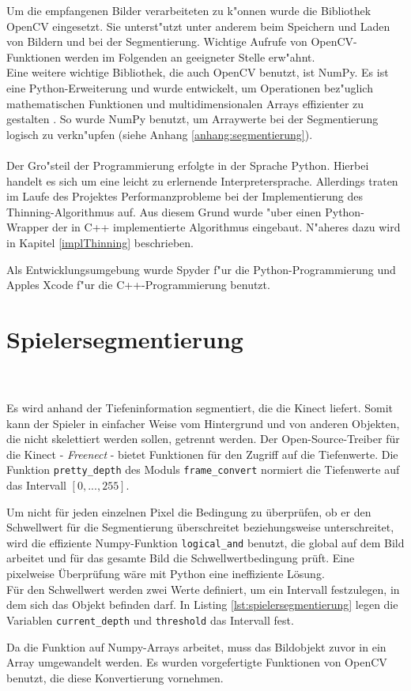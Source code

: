 Um die empfangenen Bilder verarbeiteten zu k"onnen wurde die Bibliothek OpenCV eingesetzt. Sie unterst"utzt unter anderem beim Speichern und Laden von Bildern und bei der Segmentierung. Wichtige Aufrufe von OpenCV-Funktionen werden im Folgenden an geeigneter Stelle erw"ahnt.\\
Eine weitere wichtige Bibliothek, die auch OpenCV benutzt, ist NumPy. Es ist eine Python-Erweiterung und wurde entwickelt, um Operationen bez"uglich mathematischen Funktionen und multidimensionalen Arrays effizienter zu gestalten \cite{numpy}. So wurde NumPy benutzt, um Arraywerte bei der Segmentierung logisch zu verkn"upfen (siehe Anhang \ref{anhang:segmentierung}). \\ \\ 
Der Gro"steil der Programmierung erfolgte in der Sprache Python. Hierbei handelt es sich um eine leicht zu erlernende Interpretersprache. Allerdings traten im Laufe des Projektes Performanzprobleme bei der Implementierung des Thinning-Algorithmus auf. 
 Aus diesem Grund wurde "uber einen Python-Wrapper der in C++ implementierte Algorithmus eingebaut. N"aheres dazu wird in Kapitel \ref{implThinning} beschrieben.

Als Entwicklungsumgebung wurde Spyder f"ur die Python-Programmierung und Apples Xcode f"ur die C++-Programmierung benutzt.

\section{Spielersegmentierung}
\label{segmentierung}
\\\\
Es wird anhand der Tiefeninformation segmentiert, die die Kinect liefert. Somit kann der Spieler in einfacher Weise vom Hintergrund und von anderen Objekten, die nicht skelettiert werden sollen, getrennt werden. Der Open-Source-Treiber für die Kinect - \emph{Freenect} - bietet Funktionen für den Zugriff auf die
Tiefenwerte. Die Funktion \texttt{pretty\_depth} des Moduls
\texttt{frame\_convert} normiert die Tiefenwerte auf das 
Intervall $[0,...,255]$. 

Um nicht für jeden einzelnen Pixel die Bedingung zu überprüfen, ob er den Schwellwert für die Segmentierung überschreitet beziehungsweise unterschreitet, wird die effiziente Numpy-Funktion \texttt{logical\_and} benutzt, die global auf dem Bild arbeitet und für das gesamte Bild die Schwellwertbedingung prüft. Eine pixelweise Überprüfung wäre mit Python eine ineffiziente Lösung.\\ Für den Schwellwert werden zwei 
Werte definiert, um ein Intervall festzulegen, in dem sich das Objekt befinden darf. In Listing \ref{lst:spielersegmentierung} legen die Variablen \texttt{current\_depth} und \texttt{threshold} das Intervall fest. 

Da die Funktion auf Numpy-Arrays arbeitet, muss das Bildobjekt zuvor in ein Array umgewandelt werden. 
Es wurden vorgefertigte Funktionen von OpenCV benutzt, die diese Konvertierung vornehmen. 
